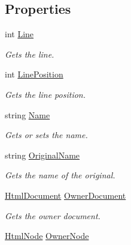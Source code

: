 \subsection*{Properties}
\begin{DoxyCompactItemize}
\item 
int \hyperlink{class_html_agility_pack_1_1_html_attribute_a76475e8e4164d9f2653b8dd4d2542809}{Line}
\begin{DoxyCompactList}\small\item\em Gets the line. \end{DoxyCompactList}\item 
int \hyperlink{class_html_agility_pack_1_1_html_attribute_a658e5573168d2e56c216feee638e00c7}{Line\+Position}
\begin{DoxyCompactList}\small\item\em Gets the line position. \end{DoxyCompactList}\item 
string \hyperlink{class_html_agility_pack_1_1_html_attribute_a5f76b6f7b7555a32f7ec35cac0dfcddb}{Name}
\begin{DoxyCompactList}\small\item\em Gets or sets the name. \end{DoxyCompactList}\item 
string \hyperlink{class_html_agility_pack_1_1_html_attribute_afb1cb5710f37b9c7b3b6e229a24809fe}{Original\+Name}
\begin{DoxyCompactList}\small\item\em Gets the name of the original. \end{DoxyCompactList}\item 
\hyperlink{class_html_agility_pack_1_1_html_document}{Html\+Document} \hyperlink{class_html_agility_pack_1_1_html_attribute_a998f0810b87fd99f75e9684d77fe9e87}{Owner\+Document}
\begin{DoxyCompactList}\small\item\em Gets the owner document. \end{DoxyCompactList}\item 
\hyperlink{class_html_agility_pack_1_1_html_node}{Html\+Node} \hyperlink{class_html_agility_pack_1_1_html_attribute_aaa66b661728b1b02691e79c5efa4cd3b}{Owner\+Node}

\end{DoxyCompactItemize}
